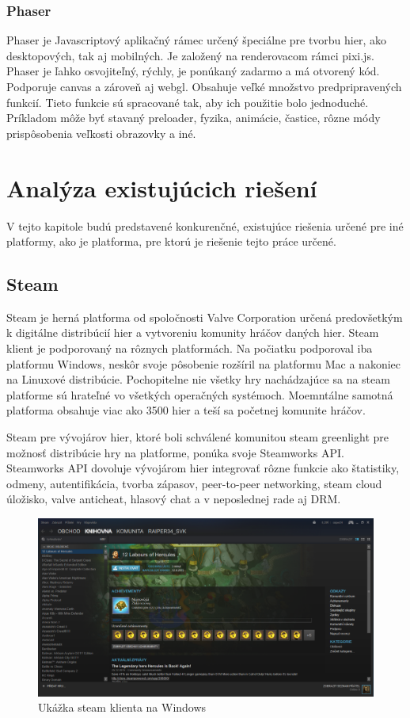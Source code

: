 \subsection{Phaser}
\label{sec:phaser}
Phaser je Javascriptový aplikačný rámec určený špeciálne pre tvorbu hier, ako desktopových, tak aj mobilných. Je založený na renderovacom rámci pixi.js. Phaser je ľahko osvojiteľný, rýchly, je ponúkaný zadarmo a má otvorený kód. Podporuje canvas a zároveň aj webgl. Obsahuje veľké množstvo predpripravených funkcií. Tieto funkcie sú spracované tak, aby ich použitie bolo jednoduché. Príkladom môže byť stavaný preloader, fyzika, animácie, častice, rôzne módy prispôsobenia veľkosti obrazovky a iné.  

\chapter{Analýza existujúcich riešení}
\label{chap:analyza}
V tejto kapitole budú predstavené konkurenčné, existujúce riešenia určené pre iné platformy, ako je platforma, pre ktorú je riešenie tejto práce určené. 


\section{Steam}
Steam je herná platforma od spoločnosti Valve Corporation určená predovšetkým k digitálne distribúcií hier a vytvoreniu komunity hráčov daných hier. Steam klient je podporovaný na rôznych platformách. Na počiatku podporoval iba platformu Windows, neskôr svoje pôsobenie rozšíril na platformu Mac a nakoniec na Linuxové distribúcie. Pochopitelne nie všetky hry nachádzajúce sa na steam platforme sú hrateľné vo všetkých operačných systémoch. Moemntálne samotná platforma obsahuje viac ako 3500 hier a teší sa početnej komunite hráčov. 

Steam pre vývojárov hier, ktoré boli schválené komunitou steam greenlight pre možnosť distribúcie hry na platforme, ponúka svoje Steamworks API. Steamworks API dovoluje vývojárom hier integrovať rôzne funkcie ako štatistiky, odmeny, autentifikácia, tvorba zápasov, peer-to-peer networking, steam cloud úložisko, valve anticheat, hlasový chat a v neposlednej rade aj DRM.
\begin{figure}[h]
  \centering
  \includegraphics[scale=0.27]{fig/steam.png}
  \caption{Ukážka steam klienta na Windows}
  \label{fig:steam}
\end{figure}

